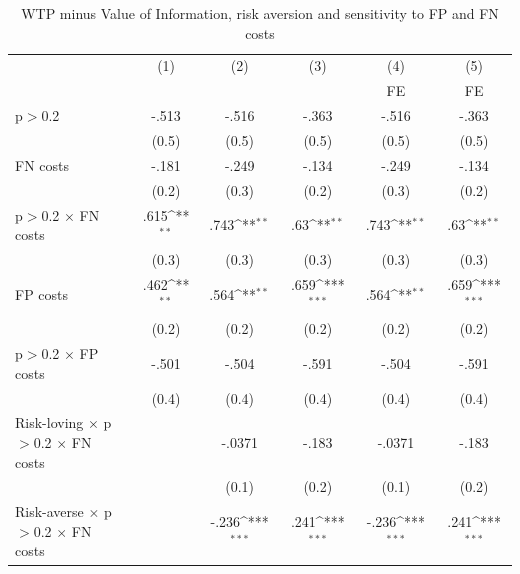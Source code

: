 \begin{table}[htbp]\centering
\def\sym#1{\ifmmode^{#1}\else\(^{#1}\)\fi}
\caption{WTP minus Value of Information, risk aversion and sensitivity to FP and FN costs}
\begin{tabular}{l*{5}{c}}
\hline\hline
                &\multicolumn{1}{c}{(1)}&\multicolumn{1}{c}{(2)}&\multicolumn{1}{c}{(3)}&\multicolumn{1}{c}{(4)}&\multicolumn{1}{c}{(5)}\\
                &\multicolumn{1}{c}{}&\multicolumn{1}{c}{}&\multicolumn{1}{c}{}&\multicolumn{1}{c}{FE}&\multicolumn{1}{c}{FE}\\
\hline
p$>$0.2         &    -.513         &    -.516         &    -.363         &    -.516         &    -.363         \\
                &    (0.5)         &    (0.5)         &    (0.5)         &    (0.5)         &    (0.5)         \\
FN costs        &    -.181         &    -.249         &    -.134         &    -.249         &    -.134         \\
                &    (0.2)         &    (0.3)         &    (0.2)         &    (0.3)         &    (0.2)         \\
p$>$0.2 $\times$ FN costs&     .615\sym{**} &     .743\sym{**} &      .63\sym{**} &     .743\sym{**} &      .63\sym{**} \\
                &    (0.3)         &    (0.3)         &    (0.3)         &    (0.3)         &    (0.3)         \\
FP costs        &     .462\sym{**} &     .564\sym{**} &     .659\sym{***}&     .564\sym{**} &     .659\sym{***}\\
                &    (0.2)         &    (0.2)         &    (0.2)         &    (0.2)         &    (0.2)         \\
p$>$0.2 $\times$ FP costs&    -.501         &    -.504         &    -.591         &    -.504         &    -.591         \\
                &    (0.4)         &    (0.4)         &    (0.4)         &    (0.4)         &    (0.4)         \\
Risk-loving $\times$ p$>$0.2 $\times$ FN costs&                  &   -.0371         &    -.183         &   -.0371         &    -.183         \\
                &                  &    (0.1)         &    (0.2)         &    (0.1)         &    (0.2)         \\
Risk-averse $\times$ p$>$0.2 $\times$ FN costs&                  &    -.236\sym{***}&     .241\sym{***}&    -.236\sym{***}&     .241\sym{***}\\

\end{tabular}
\end{table}
